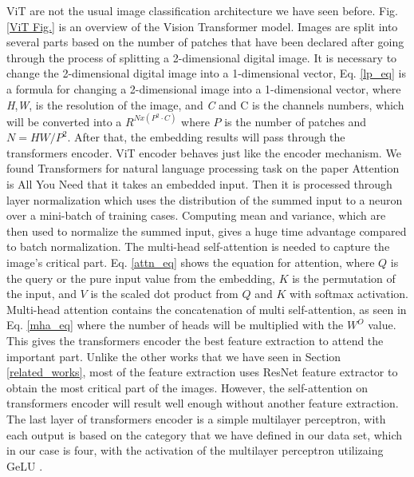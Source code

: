 \documentclass{article}
\begin{document}
ViT are not the usual image classification architecture we have seen before. Fig. \ref{ViT Fig.} is an overview of the Vision Transformer model. Images are split into several parts based on the number of patches that have been declared after going through the process of splitting a 2-dimensional digital image. It is necessary to change the 2-dimensional digital image into a 1-dimensional vector, Eq. \ref{lp_eq} is a formula for changing a 2-dimensional image into a 1-dimensional vector, where \textit{H},\textit{W}, is the resolution of the image, and \textit{C}  and C is the channels numbers, which will be converted into a
\begin{math}
	R^{N x\left(P^{2} \cdot C\right)}
\end{math} where $P$ is the number of patches and $N=HW/P^2$. After that, the embedding results will pass through the transformers encoder.
ViT encoder behaves just like the encoder mechanism. We found Transformers for natural language processing task on the paper Attention is All You Need \citep{Vaswani2017} that it takes an embedded input. Then it is processed through layer normalization \cite{ba2016layer} which uses the distribution of the summed input to a neuron over a mini-batch of training cases. Computing mean and variance, which are then used to normalize the summed input, gives a huge time advantage compared to batch normalization. The multi-head self-attention is needed to capture the image's critical part. Eq. \ref{attn_eq} shows the equation for attention, where $Q$ is the query or the pure input value from the embedding, $K$ is the permutation of the input, and $V$ is the scaled dot product from $Q$ and $K$ with softmax activation. Multi-head attention contains the concatenation of multi self-attention, as seen in Eq. \ref{mha_eq} where the number of heads will be multiplied with the $W^{O}$ value. This gives the transformers encoder the best feature extraction to attend the important part. Unlike the other works that we have seen in Section \ref{related_works}, most of the feature extraction uses ResNet \citep{he2015resnet} feature extractor to obtain the most critical part of the images. However, the self-attention on transformers encoder \citep{Dosovitskiy2020} will result well enough without another feature extraction. The last layer of transformers encoder is a simple multilayer perceptron, with each output is based on the category that we have defined in our data set, which in our case is four, with the activation of the multilayer perceptron utilizaing GeLU \citep{hendrycks2016gelu}.
\end{document}
